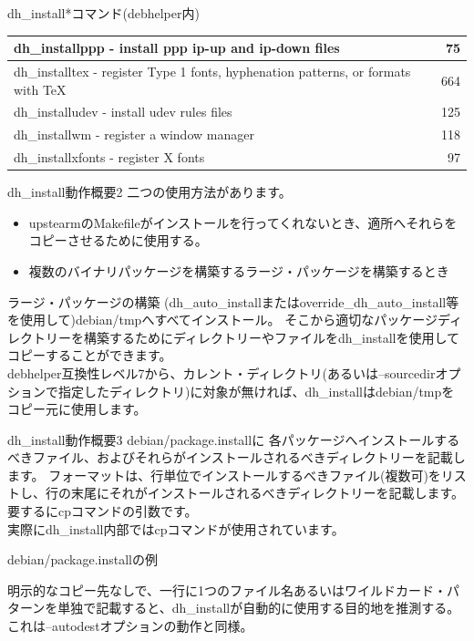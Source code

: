 \begin{frame}{dh\_install*コマンド(debhelper内)}
\begin{table}[htb]
{\begin{tabular}{|l|r|}
dh\_installppp - install ppp ip-up and ip-down files & 75 \\ \hline
dh\_installtex - register Type 1 fonts, hyphenation patterns, or formats with TeX & 664 \\ \hline
dh\_installudev - install udev rules files & 125 \\ \hline
dh\_installwm - register a window manager & 118 \\ \hline
dh\_installxfonts - register X fonts & 97 \\ \hline
\end{tabular}
}
\end{table}
\end{frame}

\begin{frame}{dh\_install動作概要2}
二つの使用方法があります。
\begin{itemize}
\item upstearmのMakefileがインストールを行ってくれないとき、適所へそれらをコピーさせるために使用する。
\item 複数のバイナリパッケージを構築するラージ・パッケージを構築するとき
\end{itemize}
\end{frame}

\begin{frame}{ラージ・パッケージの構築}
(dh\_auto\_installまたはoverride\_dh\_auto\_install等を使用して)debian/tmpへすべてインストール。
そこから適切なパッケージディレクトリーを構築するためにディレクトリーやファイルをdh\_installを使用してコピーすることができます。
\\
debhelper互換性レベル7から、カレント・ディレクトリ(あるいは--sourcedirオプションで指定したディレクトリ)に対象が無ければ、dh\_installはdebian/tmpをコピー元に使用します。
\end{frame}

\begin{frame}{dh\_install動作概要3}
debian/package.installに
各パッケージへインストールするべきファイル、およびそれらがインストールされるべきディレクトリーを記載します。
フォーマットは、行単位でインストールするべきファイル(複数可)をリストし、行の末尾にそれがインストールされるべきディレクトリーを記載します。\\
要するにcpコマンドの引数です。
\\
実際にdh\_install内部ではcpコマンドが使用されています。
\end{frame}

\begin{frame}[containsverbatim]{debian/package.installの例}


明示的なコピー先なしで、一行に1つのファイル名あるいはワイルドカード・パターンを単独で記載すると、dh\_installが自動的に使用する目的地を推測する。
これは--autodestオプションの動作と同様。
\end{frame}

